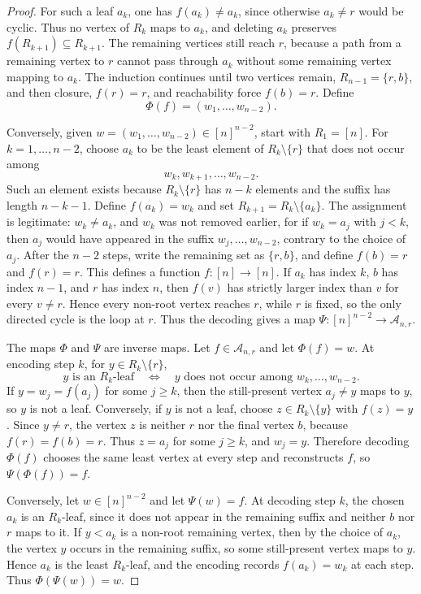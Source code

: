 \documentclass[11pt]{article}
\begin{document}
\begin{proof}
For such a leaf \(a_k\), one has \(f(a_k)\ne a_k\), since otherwise
\(a_k\ne r\) would be cyclic. Thus no vertex of \(R_k\) maps to \(a_k\), and
deleting \(a_k\) preserves \(f(R_{k+1})\subseteq R_{k+1}\). The remaining
vertices still reach \(r\), because a path from a remaining vertex to \(r\)
cannot pass through \(a_k\) without some remaining vertex mapping to \(a_k\).
The induction continues until two vertices remain, \(R_{n-1}=\{r,b\}\), and then
closure, \(f(r)=r\), and reachability force \(f(b)=r\). Define
\[
\Phi(f)=(w_1,\ldots,w_{n-2}).
\]

Conversely, given \(w=(w_1,\ldots,w_{n-2})\in[n]^{n-2}\), start with
\(R_1=[n]\). For \(k=1,\ldots,n-2\), choose \(a_k\) to be the least element of
\(R_k\setminus\{r\}\) that does not occur among
\[
w_k,w_{k+1},\ldots,w_{n-2}.
\]
Such an element exists because \(R_k\setminus\{r\}\) has \(n-k\) elements and
the suffix has length \(n-k-1\). Define \(f(a_k)=w_k\) and set
\(R_{k+1}=R_k\setminus\{a_k\}\). The assignment is legitimate: \(w_k\ne a_k\),
and \(w_k\) was not removed earlier, for if \(w_k=a_j\) with \(j<k\), then
\(a_j\) would have appeared in the suffix \(w_j,\ldots,w_{n-2}\), contrary to
the choice of \(a_j\). After the \(n-2\) steps, write the remaining set as
\(\{r,b\}\), and define \(f(b)=r\) and \(f(r)=r\). This defines a function
\(f:[n]\to[n]\). If \(a_k\) has index \(k\), \(b\) has index \(n-1\), and
\(r\) has index \(n\), then \(f(v)\) has strictly larger index than \(v\) for
every \(v\ne r\). Hence every non-root vertex reaches \(r\), while \(r\) is
fixed, so the only directed cycle is the loop at \(r\). Thus the decoding gives
a map \(\Psi:[n]^{n-2}\to\mathcal A_{n,r}\).

The maps \(\Phi\) and \(\Psi\) are inverse maps. Let \(f\in\mathcal A_{n,r}\)
and let \(\Phi(f)=w\). At encoding step \(k\), for \(y\in R_k\setminus\{r\}\),
\[
y\text{ is an }R_k\text{-leaf}
\quad\Longleftrightarrow\quad
y\text{ does not occur among }w_k,\ldots,w_{n-2}.
\]
If \(y=w_j=f(a_j)\) for some \(j\ge k\), then the still-present vertex
\(a_j\ne y\) maps to \(y\), so \(y\) is not a leaf. Conversely, if \(y\) is not
a leaf, choose \(z\in R_k\setminus\{y\}\) with \(f(z)=y\). Since \(y\ne r\),
the vertex \(z\) is neither \(r\) nor the final vertex \(b\), because
\(f(r)=f(b)=r\). Thus \(z=a_j\) for some \(j\ge k\), and \(w_j=y\). Therefore
decoding \(\Phi(f)\) chooses the same least vertex at every step and reconstructs
\(f\), so \(\Psi(\Phi(f))=f\).

Conversely, let \(w\in[n]^{n-2}\) and let \(\Psi(w)=f\). At decoding step \(k\),
the chosen \(a_k\) is an \(R_k\)-leaf, since it does not appear in the remaining
suffix and neither \(b\) nor \(r\) maps to it. If \(y<a_k\) is a non-root
remaining vertex, then by the choice of \(a_k\), the vertex \(y\) occurs in the
remaining suffix, so some still-present vertex maps to \(y\). Hence \(a_k\) is
the least \(R_k\)-leaf, and the encoding records \(f(a_k)=w_k\) at each step.
Thus \(\Phi(\Psi(w))=w\).


\end{proof}
\end{document}
